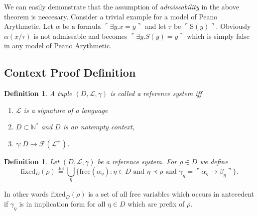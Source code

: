 \documentclass[10pt]{article}
\theoremstyle{plain}
\newtheorem{definition}[theorem]{Definition}
\newcommand{\defeq}{\stackrel{\mathrm{def}}{=}}
\newcommand{\free}{\text{free}}
\newcommand{\N}{\mathbb{N}}
\newcommand{\F}{\mathcal{F}}
\renewcommand{\L}{\mathscr{L}}
\renewcommand{\succ}{\text{S}}
\newcommand{\fixed}{\text{fixed}}
\begin{document}
We can easily demonstrate that the assumption of \textit{admissability} in the above theorem is neccesary. Consider a trivial example for a model of Peano Arythmetic. 
Let $\alpha \text{ be a formula } \ulcorner \exists y. x = y \urcorner$ and let $\tau$ be $\ulcorner \succ(y) \urcorner$. Obviously $\alpha(x/\tau)$ is not admissable and becomes 
$\ulcorner \exists y. S(y) = y \urcorner$ which is simply false in any model of Peano Arythmetic.

\subsection{Context Proof Definition}

\begin{definition}
A tuple $(D, \L, \gamma)$ is called a reference system iff
\begin{enumerate}
\item $\L$ is a signature of a language
\item $D\subset \N^*$ and $D$ is an notempty context,
\item $\gamma: \overline{D} \to \F(\L^+)$. 
\end{enumerate}
\end{definition}

\begin{definition}
\label{fixed-variables-def}
Let $(D, \L, \gamma)$ be a reference system.
For $\rho\in D$ we define
\begin{equation}
\fixed_D(\rho) \defeq 
\bigcup_\eta \{\free(\alpha_\eta) : \eta\in D \text{ and } \eta \prec \rho \text{ and } \gamma_\eta = 
\ulcorner \alpha_\eta \to \beta_\eta \urcorner \}.
\end{equation}
\end{definition}

In other words $\fixed_D(\rho)$ is a set of all free variables which occurs in antecedent
if $\gamma_\eta$ is in implication form for all $\eta\in D$ which are prefix of $\rho$.
\end{document}
